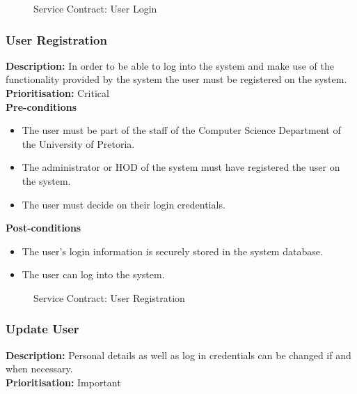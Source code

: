 \documentclass[a4paper]{article}
\begin{document}
	\begin{figure}[H]
		\centering
		\caption{Service Contract: User Login}
	\end{figure}
	
	\pagebreak
	\subsubsection{User Registration}
	
	\textbf{Description:}  In order to be able to log into the system and make use of the functionality provided by the system the user must be registered on the system. \\
	\textbf{Prioritisation:} Critical\\
	
	\textbf{Pre-conditions}
	\begin{itemize}
		\item The user must be part of the staff of the Computer Science Department of the University of Pretoria.
		\item The administrator or HOD of the system must have registered the user on the system.
		\item The user must decide on their login credentials.
	\end{itemize}
	
	\textbf{Post-conditions}
	\begin{itemize}
		\item The user's login information is securely stored in the system database.
		\item The user can log into the system.
	\end{itemize}
	
	\begin{figure}[H]
		\centering
		\caption{Service Contract: User Registration}
	\end{figure}
	
	
	\pagebreak
	\subsubsection{Update User}
	
	\textbf{Description:} Personal details as well as log in credentials can be changed if and when necessary.\\
	\textbf{Prioritisation:} Important\\
	
\end{document}
